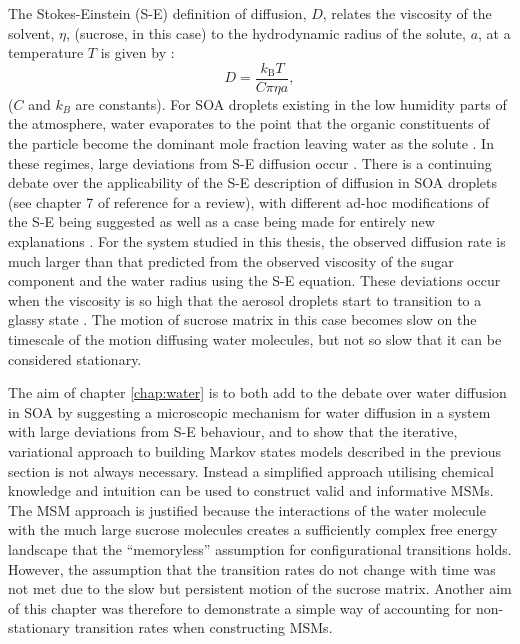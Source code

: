 The Stokes-Einstein (S-E) definition of diffusion, $D$, relates the viscosity of the solvent, $\eta$, (sucrose, in this case) to the hydrodynamic radius of the solute, $a$, at a temperature $T$ is given by \cite[chapter  17]{dill2010molecular}:
\begin{equation}\label{eqn:diffusion_intro}
D=\frac{k_{\mathrm{B}} T}{C \pi \eta a},
\end{equation}
($C$ and $k_{B}$ are constants).  For SOA droplets existing in the low humidity parts of the atmosphere, water evaporates to the point that the organic constituents of the particle become the dominant mole fraction leaving water as the solute \cite{powerTransitionLiquidSolidlike2013, Price2014, Molinero2005}. In these regimes, large deviations from S-E diffusion occur \cite{powerTransitionLiquidSolidlike2013,Price2015,Chenyakin2017}. There is a continuing debate over the applicability of the S-E description of diffusion in SOA droplets (see chapter 7 of reference \cite{Ingram2017} for a review), with different ad-hoc modifications of the S-E being suggested \cite{Harris2009,price2016sucrose, Fernandez-Alonso2007} as well as a case being made for entirely new explanations \cite{saltzmanActivatedHoppingDynamical2006}. For the system studied in this thesis, the observed diffusion rate is much larger than that predicted from the observed viscosity of the sugar component and the water radius using the S-E equation. These deviations occur when the viscosity is so high that the aerosol droplets start to transition to a glassy state \cite{Bones2012}. The motion of sucrose matrix in this case becomes slow on the timescale of the motion diffusing water molecules, but not so slow that it can be considered stationary. 

The aim of chapter \ref{chap:water} is to both add to the debate over water diffusion in SOA by suggesting a microscopic mechanism for water diffusion in a system with large deviations from S-E behaviour, and to show that the iterative,  variational approach to building Markov states models described in the previous section is not always necessary. Instead a simplified approach  utilising chemical knowledge and intuition can be used to construct valid and informative MSMs. The MSM approach is justified because the interactions of the water molecule with the much large sucrose molecules creates a sufficiently complex free energy landscape that the ``memoryless'' assumption for configurational transitions holds.  However, the assumption that the transition rates do not change with time was not met due to the slow but persistent motion of the sucrose matrix. Another aim of this  chapter was therefore to demonstrate a simple way of accounting for non-stationary transition rates when constructing MSMs.  

